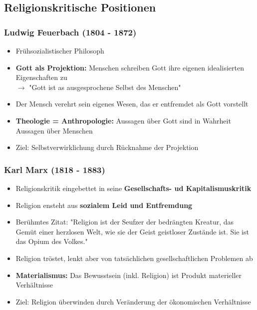 \subsection{Religionskritische Positionen}

\subsubsection{Ludwig Feuerbach (1804 - 1872)}
\begin{itemize}
    \item Frühsozialistischer Philosoph
    \item \textbf{Gott als Projektion:} Menschen schreiben Gott ihre eigenen idealisierten Eigenschaften zu \\
    $\rightarrow$ "Gott ist as ausgesprochene Selbst des Menschen"
    \item Der Mensch verehrt sein eigenes Wesen, das er entfremdet als Gott vorstellt
    \item \textbf{Theologie = Anthropologie:} Aussagen über Gott sind in Wahrheit Aussagen über Menschen
    \item Ziel: Selbstverwirklichung durch Rücknahme der Projektion
\end{itemize}


\subsubsection{Karl Marx (1818 - 1883)}
\begin{itemize}
    \item Religionskritik eingebettet in seine \textbf{Gesellschafts- ud Kapitalismuskritik}
    \item Religion ensteht aus \textbf{sozialem Leid und Entfremdung}
    \item Berühmtes Zitat: "Religion ist der Seufzer der bedrängten Kreatur, das Gemüt einer herzlosen Welt, wie sie der Geist geistloser Zustände ist. Sie ist das Opium des Volkes."
    \item Religion tröstet, lenkt aber von tatsächlichen gesellschaftlichen Problemen ab
    \item \textbf{Materialismus:} Das Bewusstsein (inkl. Religion) ist Produkt materieller Verhältnisse
    \item Ziel: Religion überwinden durch Veränderung der ökonomischen Verhältnisse
\end{itemize}

